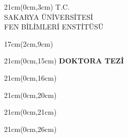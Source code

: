 \thispagestyle{empty}
\begingroup
\singlespacing
\setlength{\parskip}{0pt}

\begin{textblock*}{21cm}(0cm,3cm)
  \centering\fontsize{12}{14}\selectfont
  T.C.\\
  SAKARYA ÜNİVERSİTESİ\\
  FEN BİLİMLERİ ENSTİTÜSÜ
\end{textblock*}

\begin{textblock*}{17cm}(2cm,9cm)
  \centering\bfseries\fontsize{12}{14}\selectfont
  \TezBasligiKapak
\end{textblock*}

\begin{textblock*}{21cm}(0cm,15cm)
  \centering\bfseries\fontsize{12}{14}\selectfont DOKTORA TEZİ
\end{textblock*}

\begin{textblock*}{21cm}(0cm,16cm)
  \centering\fontsize{12}{14}\selectfont \TezYazari
\end{textblock*}

\begin{textblock*}{21cm}(0cm,20cm)
  \centering\fontsize{12}{14}\selectfont \AnabilimDali
\end{textblock*}

\begin{textblock*}{21cm}(0cm,21cm)
  \centering\fontsize{12}{14}\selectfont \BilimDali
\end{textblock*}

\begin{textblock*}{21cm}(0cm,26cm)
  \centering\fontsize{12}{14}\selectfont \TeslimTarihi
\end{textblock*}

\null
\endgroup

